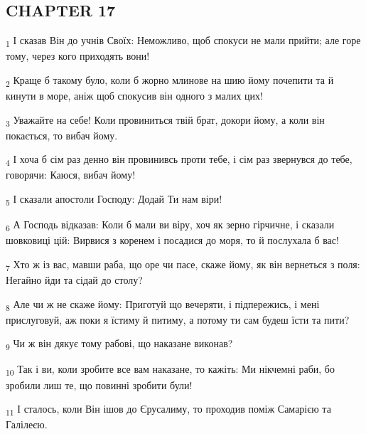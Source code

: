 \subsection{CHAPTER 17}
\begin{tcolorbox}
\textsubscript{1} І сказав Він до учнів Своїх: Неможливо, щоб спокуси не мали прийти; але горе тому, через кого приходять вони!
\end{tcolorbox}
\begin{tcolorbox}
\textsubscript{2} Краще б такому було, коли б жорно млинове на шию йому почепити та й кинути в море, аніж щоб спокусив він одного з малих цих!
\end{tcolorbox}
\begin{tcolorbox}
\textsubscript{3} Уважайте на себе! Коли провиниться твій брат, докори йому, а коли він покається, то вибач йому.
\end{tcolorbox}
\begin{tcolorbox}
\textsubscript{4} І хоча б сім раз денно він провинивсь проти тебе, і сім раз звернувся до тебе, говорячи: Каюся, вибач йому!
\end{tcolorbox}
\begin{tcolorbox}
\textsubscript{5} І сказали апостоли Господу: Додай Ти нам віри!
\end{tcolorbox}
\begin{tcolorbox}
\textsubscript{6} А Господь відказав: Коли б мали ви віру, хоч як зерно гірчичне, і сказали шовковиці цій: Вирвися з коренем і посадися до моря, то й послухала б вас!
\end{tcolorbox}
\begin{tcolorbox}
\textsubscript{7} Хто ж із вас, мавши раба, що оре чи пасе, скаже йому, як він вернеться з поля: Негайно йди та сідай до столу?
\end{tcolorbox}
\begin{tcolorbox}
\textsubscript{8} Але чи ж не скаже йому: Приготуй що вечеряти, і підпережись, і мені прислуговуй, аж поки я їстиму й питиму, а потому ти сам будеш їсти та пити?
\end{tcolorbox}
\begin{tcolorbox}
\textsubscript{9} Чи ж він дякує тому рабові, що наказане виконав?
\end{tcolorbox}
\begin{tcolorbox}
\textsubscript{10} Так і ви, коли зробите все вам наказане, то кажіть: Ми нікчемні раби, бо зробили лиш те, що повинні зробити були!
\end{tcolorbox}
\begin{tcolorbox}
\textsubscript{11} І сталось, коли Він ішов до Єрусалиму, то проходив поміж Самарією та Галілеєю.
\end{tcolorbox}
